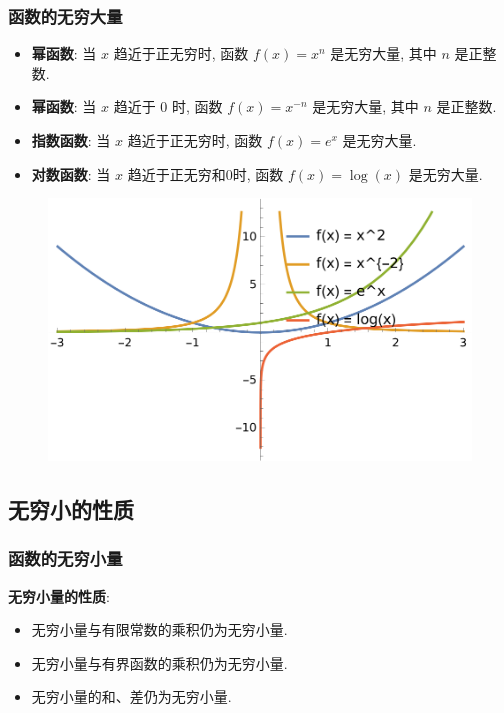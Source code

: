 \documentclass[
10pt, 
aspectratio=43, 
]{beamer}
\begin{document}
\begin{frame}
	\frametitle{函数的无穷大量}
	\begin{itemize}
		\item<1-> \textbf{幂函数}: 当 $x$ 趋近于正无穷时, 函数 $f(x) = x^n$ 是无穷大量, 其中 $n$ 是正整数. 
		\item<2-> \textbf{幂函数}: 当 $x$ 趋近于 $0$ 时, 函数 $f(x) = x^{-n}$ 是无穷大量, 其中 $n$ 是正整数. 
		\item<3-> \textbf{指数函数}: 当 $x$ 趋近于正无穷时, 函数 $f(x) = e^x$ 是无穷大量. 
		\item<4-> \textbf{对数函数}: 当 $x$ 趋近于正无穷和$0$时, 函数 $f(x) = \log(x)$ 是无穷大量. 
	\end{itemize}
	
	\begin{figure}
		\centering
		\includegraphics[width=0.5\linewidth]{infty.png}
		\label{fig: enter-label}
	\end{figure}
	
\end{frame}


\subsection{无穷小的性质}

\begin{frame}
	\frametitle{函数的无穷小量}
	
	\textbf{无穷小量的性质}: 
	\begin{itemize}
		\item 无穷小量与有限常数的乘积仍为无穷小量.\pause 
		\item 无穷小量与有界函数的乘积仍为无穷小量. \pause
		\item 无穷小量的和、差仍为无穷小量. \pause
	\end{itemize}
	
	
\end{frame}
\end{document}
